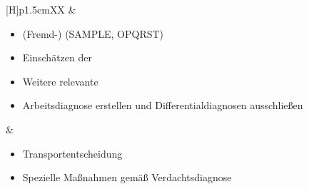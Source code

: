 \documentclass[
ngerman,
paper=a4,
asymmetric,
fontsize=9pt,
draft=false,
openany,
numbers=noenddot,
bibtotocnumbered,
footnotes=multiple,
toc=flat,
]{scrbook}
\begin{document}
{\begin{minipage}[t]{\linewidth -
{2\fboxrule} - {2\fboxsep}}
\begin{minipage}[t]{\linewidth}
{\begin{tabularx}{\linewidth}[H]{p{1.5cm}XX}
&
\begin{minipage}[t]{\linewidth}
\begin{itemize}
  \item (Fremd-)  (SAMPLE, OPQRST)
  \item Einschätzen der 
  \item Weitere relevante 
  \item Arbeitsdiagnose erstellen und Differentialdiagnosen
  ausschließen
\end{itemize}
\end{minipage}
&
\noindent\color{Indigo}\begin{minipage}[t]{\linewidth}
\begin{itemize}
  \item Transportentscheidung 
  \item Spezielle Maßnahmen gemäß Verdachtsdiagnose
\end{itemize}
\end{minipage}
\\\addlinespace\bottomrule
\end{tabularx}

\vspace{-0.5\baselineskip}\begin{center}


\end{center}}
\end{minipage}
\end{minipage}}
\end{document}
